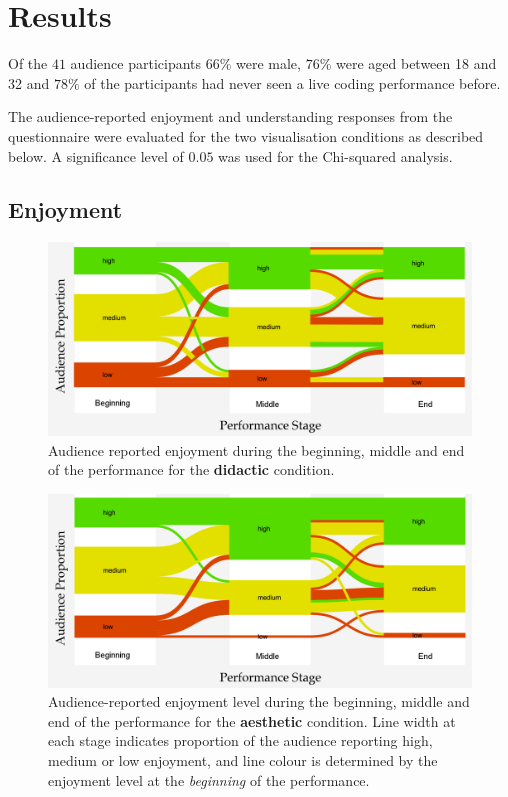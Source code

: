 \section{Results}

Of the $41$ audience participants $66\%$ were male, $76\%$ were aged
between 18 and 32 and $78\%$ of the participants had never seen a live
coding performance before.

The audience-reported enjoyment and understanding responses from the
questionnaire were evaluated for the two visualisation conditions as
described below. A significance level of $0.05$ was used for the
Chi-squared analysis.

\subsection{Enjoyment}


\begin{figure}
  \centering
  \includegraphics[width=\columnwidth]{../study-2/results/graphs/didactic-enjoyment-final}
  \caption{Audience reported enjoyment during the beginning, middle and
    end of the performance for the \textbf{didactic} condition.}
  \label{fig:didactic-enjoyment}
\end{figure}

\begin{figure}
  \centering
  \includegraphics[width=\columnwidth]{../study-2/results/graphs/aesthetic-enjoyment-final}
  \caption{Audience-reported enjoyment level during the beginning,
    middle and end of the performance for the \textbf{aesthetic} condition.
    Line width at each stage indicates proportion of the audience
    reporting high, medium or low enjoyment, and line colour is
    determined by the enjoyment level at the \emph{beginning} of the
    performance.}
  \label{fig:aesthetic-enjoyment}
\end{figure}


